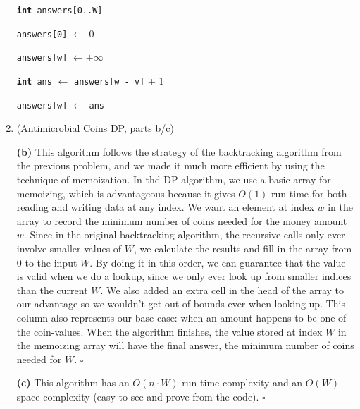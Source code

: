 \documentclass{article}
\begin{document}
\begin{enumerate}
\begin{center}
\begin{minipage}{0.625\linewidth}
\begin{algorithm}[H]
          \texttt{\textbf{int} answers[0..W]}

          \texttt{answers[0]} $\gets$ 0

          {
            \texttt{answers[w]} $\gets +\infty$

            {
              {
                \texttt{\textbf{int} ans} $\gets$ \texttt{answers[w - v]} + 1

                {
                  \texttt{answers[w]} $\gets$ \texttt{ans}
                }
              }
            }
          }

        \end{algorithm}
      \end{minipage}
    \end{center}

    \pagebreak

    \setcounter{enumi}{1} %
  \item (Antimicrobial Coins DP, parts b/c)

    \textbf{(b)} This algorithm follows the strategy of the backtracking algorithm from the previous problem, and we made it much more efficient by using the technique of memoization. In thd DP algorithm, we use a basic array for memoizing, which is advantageous because it gives $O(1)$ run-time for both reading and writing data at any index. We want an element at index $w$ in the array to record the minimum number of coins needed for the money amount $w$. Since in the original backtracking algorithm, the recursive calls only ever involve smaller values of $W$, we calculate the results and fill in the array from 0 to the input $W$. By doing it in this order, we can guarantee that the value is valid when we do a lookup, since we only ever look up from smaller indices than the current $W$. We also added an extra cell in the head of the array to our advantage so we wouldn't get out of bounds ever when looking up. This column also represents our base case: when an amount happens to be one of the coin-values. When the algorithm finishes, the value stored at index $W$ in the memoizing array will have the final answer, the minimum number of coins needed for $W$. $\square$

    \textbf{(c)} This algorithm has an $O(n \cdot W)$ run-time complexity and an $O(W)$ space complexity (easy to see and prove from the code). $\square$


\end{enumerate}
\end{document}
